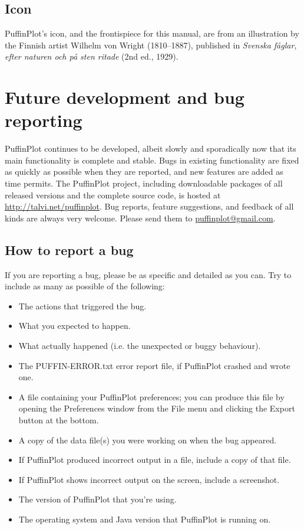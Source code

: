 \documentclass[a4paper,british]{article}
\newcommand{\ppcmd}[1]{\textsf{#1}} %
\begin{document}
\subsection*{Icon}

PuffinPlot's icon, and the frontispiece for this manual, are from an
illustration by the Finnish artist Wilhelm von Wright (1810--1887), published
in \emph{Svenska f\aa glar, efter naturen och p\aa{} sten ritade} (2nd ed.,
1929).


\section{Future development and bug reporting}

PuffinPlot continues to be developed, albeit slowly and sporadically now
that its main functionality is complete and stable. Bugs in existing
functionality are fixed as quickly as possible when they are reported,
and new features are added as time permits. The PuffinPlot project,
including downloadable packages of all released versions and the
complete source code, is hosted at \url{http://talvi.net/puffinplot}.
Bug reports, feature suggestions, and feedback of all kinds are always
very welcome. Please send them to
\textsf{\href{mailto:puffinplot@gmail.com}{puffinplot@gmail.com}}.

\subsection*{How to report a bug}

If you are reporting a bug, please be as specific and detailed as you
can. Try to include as many as possible of the following:

\begin{itemize}
\item The actions that triggered the bug.
\item What you expected to happen.
\item What actually happened (i.e. the unexpected or buggy behaviour).
\item The \ppcmd{PUFFIN-ERROR.txt} error report file, if PuffinPlot
  crashed and wrote one.
\item A file containing your PuffinPlot preferences; you can produce
  this file by opening the Preferences window from the File menu and
  clicking the \ppcmd{Export} button at the bottom.
\item A copy of the data file(s) you were working on when the bug
  appeared.
\item If PuffinPlot produced incorrect output in a file, include a copy
  of that file.
\item If PuffinPlot shows incorrect output on the screen, include a
  screenshot.
\item The version of PuffinPlot that you're using.
\item The operating system and Java version that PuffinPlot is running
  on.
\end{itemize}
\end{document}
